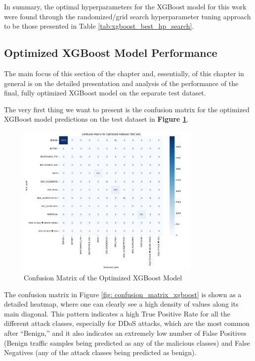In summary, the optimal hyperparameters for the XGBoost model for this work were found through the randomized/grid search hyperparameter tuning approach to be those presented in Table \ref{tab:xgboost_best_hp_search}.

\subsection{Optimized XGBoost Model Performance}

The main focus of this section of the chapter and, essentially, of this chapter in general is on the detailed presentation and analysis of the performance of the final, fully optimized XGBoost model on the separate test dataset.

The very first thing we want to present is the confusion matrix for the optimized XGBoost model predictions on the test dataset in \textbf{Figure \ref{fig:confusion_matrix_xgboost}}.

\begin{figure}[H]
	\centering
	\includegraphics[width=0.8\textwidth]{assets/figures/results/confusion_matrix_xgboost.png}
	\caption{Confusion Matrix of the Optimized XGBoost Model}
	\label{fig:confusion_matrix_xgboost}
\end{figure}


The confusion matrix in Figure \ref{fig: confusion_matrix_xgboost} is shown as a detailed heatmap, where one can clearly see a high density of values along its main diagonal. This pattern indicates a high True Positive Rate for all the different attack classes, especially for DDoS attacks, which are the most common after “Benign,” and it also indicates an extremely low number of False Positives (Benign traffic samples being predicted as any of the malicious classes) and False Negatives (any of the attack classes being predicted as benign).

